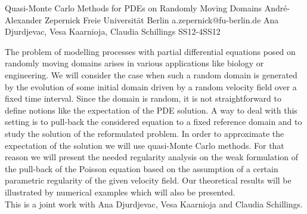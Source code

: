 \begin{talk}
  {Quasi-Monte Carlo Methods for PDEs on Randomly Moving Domains}%
  {André-Alexander Zepernick}%
  {Freie Universität Berlin}%
  {a.zepernick@fu-berlin.de}%
  {Ana Djurdjevac, Vesa Kaarnioja, Claudia Schillings }%
{}{}{SS12-4}{SS12}

			
The problem of modelling processes with partial differential equations posed on randomly moving domains arises in various applications like biology or engineering. We will consider the case when such a random domain is generated by the evolution of some initial domain driven by a random velocity field over a fixed time interval. Since the domain is random, it is not straightforward to define notions like the expectation of the PDE solution. A way to deal with this setting is to pull-back the considered equation to a fixed reference domain and to study the solution of the reformulated problem. In order to approximate the expectation of the solution we will use quasi-Monte Carlo methods. For that reason we will present the needed regularity analysis on the weak formulation of the pull-back of the  Poisson equation based on the assumption of a certain parametric regularity of the given velocity field. Our theoretical results will be illustrated by numerical examples which will also be presented.\\
This is a joint work with Ana Djurdjevac, Vesa Kaarnioja and Claudia Schillings. 

\end{talk}

